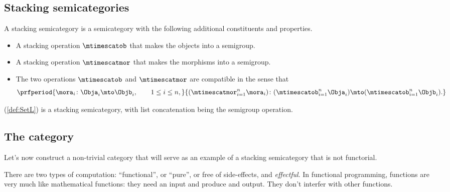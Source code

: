 \subsection{Stacking semicategories}

\begin{ctdefinition}
    \label{def:stacking-semi-cat}
    A stacking semicategory is a semicategory with the following additional constituents and properties.

    \constit
    \begin{itemize}
        \item A stacking operation $\mtimescatob$ that makes the objects into a semigroup.
        \item A stacking operation $\mtimescatmor$ that makes the morphisms into a semigroup.
    \end{itemize}

    \condit
    \begin{itemize}
        \item The two operations $\mtimescatob$ and $\mtimescatmor$ are compatible in the sense that
              \begin{equation}
                  \prfperiod{
                      \mora_i \colon \Obja_i \mto \Objb_i, \qquad 1 \leq i \leq n,
                  }{
                      ( \mtimescatmor_{i=1}^n \mora_i )\colon( \mtimescatob_{i=1}^n \Obja_i) \mto (\mtimescatob_{i=1}^n \Objb_i).
                  }
              \end{equation}
    \end{itemize}
\end{ctdefinition}

\begin{example}
    \SetL (\cref{def:SetL}) is a stacking semicategory,
    with list concatenation being the semigroup operation.
\end{example}

\subsection{The \Effects category}

Let's now construct a non-trivial category that will serve as an example of a stacking semicategory that is not functorial.

There are two types of computation: ``functional'', or ``pure'', or free of side-effects, and \emph{effectful}.
In functional programming, functions are very much like mathematical functions: they need an input and produce and output.
They don't interfer with other functions.

